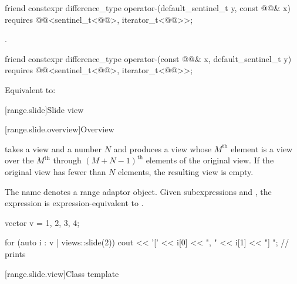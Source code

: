 \begin{itemdecl}
friend constexpr difference_type operator-(default_sentinel_t y, const @@& x)
  requires @@<sentinel_t<@@>, iterator_t<@@>>;
\end{itemdecl}

\begin{itemdescr}
\pnum
\returns
{}.
\end{itemdescr}

\begin{itemdecl}
friend constexpr difference_type operator-(const @@& x, default_sentinel_t y)
  requires @@<sentinel_t<@@>, iterator_t<@@>>;
\end{itemdecl}

\begin{itemdescr}
\pnum
\effects
Equivalent to: 
\end{itemdescr}

[range.slide]{Slide view}

[range.slide.overview]{Overview}

\pnum
{} takes a view and a number $N$ and
produces a view
whose $M^\text{th}$ element is a view over
the $M^\text{th}$ through
$(M + N - 1)^\text{th}$ elements
of the original view.
If the original view has fewer than $N$ elements,
the resulting view is empty.

\pnum
{}%
The name  denotes
a range adaptor object.
Given subexpressions  and ,
the expression  is expression-equivalent to
.
\begin{example}
\begin{codeblock}
vector v = {1, 2, 3, 4};

for (auto i : v | views::slide(2)) {
  cout << '[' << i[0] << ", " << i[1] << "] ";          // prints \tcode{[1, 2] [2, 3] [3, 4]}
}
\end{codeblock}
\end{example}

[range.slide.view]{Class template }

